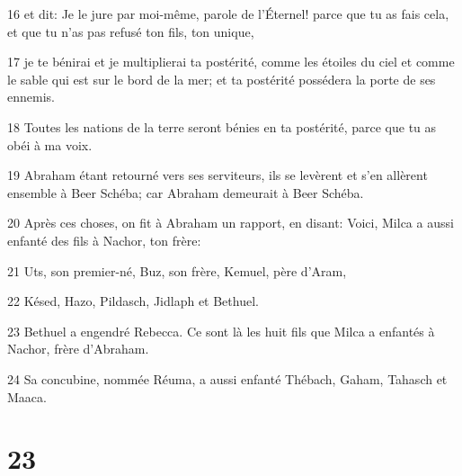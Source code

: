 \par 16 et dit: Je le jure par moi-même, parole de l'Éternel! parce que tu as fais cela, et que tu n'as pas refusé ton fils, ton unique,
\par 17 je te bénirai et je multiplierai ta postérité, comme les étoiles du ciel et comme le sable qui est sur le bord de la mer; et ta postérité possédera la porte de ses ennemis.
\par 18 Toutes les nations de la terre seront bénies en ta postérité, parce que tu as obéi à ma voix.
\par 19 Abraham étant retourné vers ses serviteurs, ils se levèrent et s'en allèrent ensemble à Beer Schéba; car Abraham demeurait à Beer Schéba.
\par 20 Après ces choses, on fit à Abraham un rapport, en disant: Voici, Milca a aussi enfanté des fils à Nachor, ton frère:
\par 21 Uts, son premier-né, Buz, son frère, Kemuel, père d'Aram,
\par 22 Késed, Hazo, Pildasch, Jidlaph et Bethuel.
\par 23 Bethuel a engendré Rebecca. Ce sont là les huit fils que Milca a enfantés à Nachor, frère d'Abraham.
\par 24 Sa concubine, nommée Réuma, a aussi enfanté Thébach, Gaham, Tahasch et Maaca.

\chapter{23}

